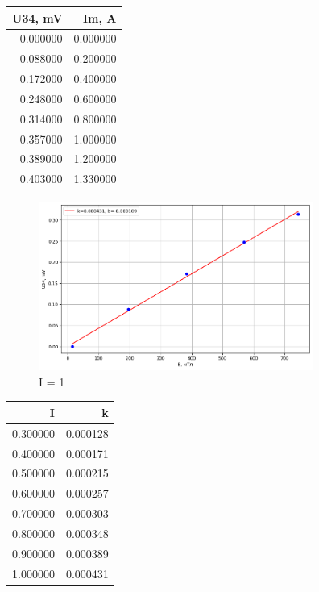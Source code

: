 \documentclass[a4paper, 12pt]{article}
\begin{document}
        \begin{table}[h!]
            \centering
        \begin{tabular}{rr}
            \toprule
            U34, mV & Im, A \\
            \midrule
            0.000000 & 0.000000 \\
            0.088000 & 0.200000 \\
            0.172000 & 0.400000 \\
            0.248000 & 0.600000 \\
            0.314000 & 0.800000 \\
            0.357000 & 1.000000 \\
            0.389000 & 1.200000 \\
            0.403000 & 1.330000 \\
            \bottomrule
            \end{tabular}
        \end{table}

            \begin{figure}[h!]
                \centering
                \includegraphics[width=90mm]{./images/image copy 7.png}
                \caption{I = 1}
            \end{figure}

\newpage

\begin{table}
    
    \centering

    
\begin{tabular}{rr}
    \toprule
    I & k \\
    \midrule
    0.300000 & 0.000128 \\
    0.400000 & 0.000171 \\
    0.500000 & 0.000215 \\
    0.600000 & 0.000257 \\
    0.700000 & 0.000303 \\
    0.800000 & 0.000348 \\
    0.900000 & 0.000389 \\
    1.000000 & 0.000431 \\
    \bottomrule
    \end{tabular}
\end{table}
\end{document}
